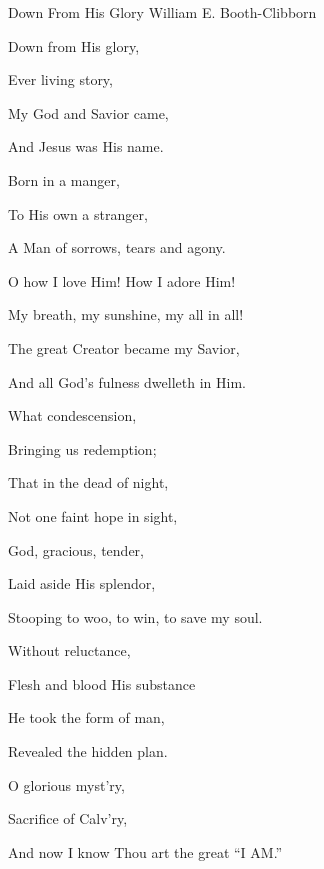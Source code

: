 \documentclass[12pt]{book}
\begin{document}
\begin{song}{Down From His Glory}{}
  {\SBPubDom}
  {William E. Booth-Clibborn}
  {}
  {}

  \begin{SBVerse}
    Down from His glory,

    Ever living story,

    My God and Savior came,

    And Jesus was His name.

    Born in a manger,

    To His own a stranger,

    A Man of sorrows, tears and agony.
  \end{SBVerse}

  \begin{SBOpGroup}
    O how I love Him! How I adore Him!

    My breath, my sunshine, my all in all!

    The great Creator became my Savior,

    And all God's fulness dwelleth in Him.
  \end{SBOpGroup}

  \begin{SBVerse}
    What condescension,

    Bringing us redemption;

    That in the dead of night,

    Not one faint hope in sight,

    God, gracious, tender,

    Laid aside His splendor,

    Stooping to woo, to win, to save my soul.
  \end{SBVerse}

  \begin{SBVerse}
    Without reluctance,

    Flesh and blood His substance

    He took the form of man,

    Revealed the hidden plan.

    O glorious myst'ry,

    Sacrifice of Calv'ry,

    And now I know Thou art the great ``I AM.''
  \end{SBVerse}
\end{song}
\end{document}
